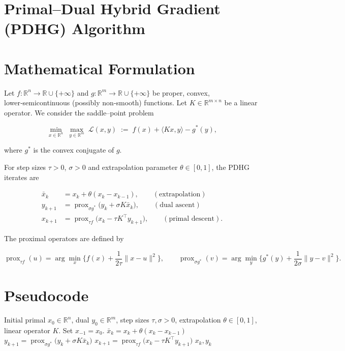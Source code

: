 \documentclass[11pt]{article}
\newcommand{\prox}{\operatorname{prox}}
\newcommand{\dual}{\operatorname{prox}_{\sigma g^{*}}}
\newcommand{\primal}{\operatorname{prox}_{\tau f}}
\begin{document}
\section*{Primal–Dual Hybrid Gradient (PDHG) Algorithm}

\section*{Mathematical Formulation}
Let $f:\mathbb{R}^{n}\rightarrow\mathbb{R}\cup\{+\infty\}$ and $g:\mathbb{R}^{m}\rightarrow\mathbb{R}\cup\{+\infty\}$ be proper, convex, lower‑semicontinuous (possibly non‑smooth) functions.  
Let $K\in\mathbb{R}^{m\times n}$ be a linear operator.  
We consider the saddle–point problem  

\[
\min_{x\in\mathbb{R}^{n}}\;\max_{y\in\mathbb{R}^{m}} \; \mathcal{L}(x,y)\;:=\; f(x)+\langle Kx ,y\rangle-g^{*}(y),
\tag{1}
\]

where $g^{*}$ is the convex conjugate of $g$.  

For step sizes $\tau>0$, $\sigma>0$ and extrapolation parameter $\theta\in[0,1]$, the PDHG iterates are

\[
\begin{aligned}
\bar{x}_{k} &= x_{k}+ \theta (x_{k}-x_{k-1}), \qquad (\text{extrapolation})\\[4pt]
y_{k+1}   &= \dual\!\Big(y_{k}+ \sigma K\bar{x}_{k}\Big), \qquad (\text{dual ascent})\\[4pt]
x_{k+1}   &= \primal\!\Big(x_{k}- \tau K^{\top} y_{k+1}\Big), \qquad (\text{primal descent}).
\end{aligned}
\tag{2}
\]

The proximal operators are defined by  

\[
\prox_{\tau f}(u)=\arg\min_{x}\Big\{f(x)+\frac{1}{2\tau}\|x-u\|^{2}\Big\},
\qquad
\prox_{\sigma g^{*}}(v)=\arg\min_{y}\Big\{g^{*}(y)+\frac{1}{2\sigma}\|y-v\|^{2}\Big\}.
\tag{3}
\]

\section*{Pseudocode}
\begin{algorithm}[H]
\caption{Primal–Dual Hybrid Gradient (PDHG)}\label{alg:pdhg}
\begin{algorithmic}[1]
\REQUIRE Initial primal $x_{0}\in\mathbb{R}^{n}$, dual $y_{0}\in\mathbb{R}^{m}$,
step sizes $\tau,\sigma>0$, extrapolation $\theta\in[0,1]$, linear operator $K$.
\STATE Set $x_{-1}=x_{0}$.
    \STATE $\displaystyle \bar{x}_{k}=x_{k}+ \theta (x_{k}-x_{k-1})$ \hfill{}
    \STATE $\displaystyle y_{k+1}= \prox_{\sigma g^{*}}\!\big(y_{k}+ \sigma K\bar{x}_{k}\big)$ \hfill{}
    \STATE $\displaystyle x_{k+1}= \prox_{\tau f}\!\big(x_{k}- \tau K^{\top} y_{k+1}\big)$ \hfill{}
\ENDFOR
\RETURN $x_{k},y_{k}$
\end{algorithmic}
\end{algorithm}
\end{document}

